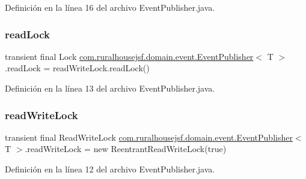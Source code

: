 Definición en la línea 16 del archivo Event\+Publisher.\+java.

\mbox{\label{classcom_1_1ruralhousejsf_1_1domain_1_1event_1_1_event_publisher_a5ffe504fad62f049d51a80fb912b97f5}} 
\subsubsection{\texorpdfstring{readLock}{readLock}}
{\footnotesize\ttfamily transient final Lock \mbox{\hyperlink{classcom_1_1ruralhousejsf_1_1domain_1_1event_1_1_event_publisher}{com.\+ruralhousejsf.\+domain.\+event.\+Event\+Publisher}}$<$ T $>$.read\+Lock = read\+Write\+Lock.\+read\+Lock()\hspace{0.3cm}{\ttfamily [protected]}}



Definición en la línea 13 del archivo Event\+Publisher.\+java.

\mbox{\label{classcom_1_1ruralhousejsf_1_1domain_1_1event_1_1_event_publisher_a5fc44b6d9dfee072080a75909bc6ac8d}} 
\subsubsection{\texorpdfstring{readWriteLock}{readWriteLock}}
{\footnotesize\ttfamily transient final Read\+Write\+Lock \mbox{\hyperlink{classcom_1_1ruralhousejsf_1_1domain_1_1event_1_1_event_publisher}{com.\+ruralhousejsf.\+domain.\+event.\+Event\+Publisher}}$<$ T $>$.read\+Write\+Lock = new Reentrant\+Read\+Write\+Lock(true)\hspace{0.3cm}{\ttfamily [private]}}



Definición en la línea 12 del archivo Event\+Publisher.\+java.

